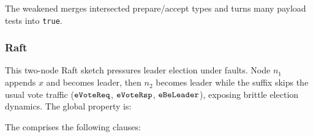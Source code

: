 \vspace{-.4cm}\par\nobreak\noindent
The weakened \tyName{} merges intersected prepare/accept types and turns many payload tests into \texttt{true}.

\newpage
\subsubsection*{Raft}
This two-node Raft sketch pressures leader election under faults. Node \(n_1\) appends \(x\) and becomes leader, then \(n_2\) becomes leader while the suffix skips the usual vote traffic (\(\boldsymbol{{\tt eVoteReq}}\), \(\boldsymbol{{\tt eVoteRsp}}\), \(\boldsymbol{{\tt eBeLeader}}\)), exposing brittle election dynamics. The global property is:
\vspace{-.35cm}\par{}
\vspace{-.4cm}\par\nobreak\noindent
The \tyName{} comprises the following clauses:
